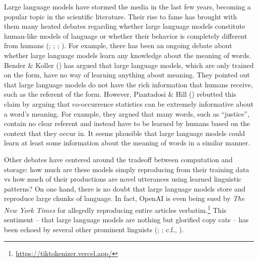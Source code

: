 \documentclass[
  12pt,
  letterpaper,
]{scrreprt}
\begin{document}
Large language models have stormed the media in the last few years,
becoming a popular topic in the scientific literature. Their rise to
fame has brought with them many heated debates regarding whether large
language models constitute human-like models of language or whether
their behavior is completely different from humans
(;
;
;
). For example, there has been an ongoing debate about whether
large language models learn any knowledge about the meaning of words.
Bender \& Koller () has
argued that large language models, which are only trained on the form,
have no way of learning anything about meaning. They pointed out that
large language models do not have the rich information that humans
receive, such as the referent of the form. However, Piantadosi \& Hill
() rebutted this
claim by arguing that co-occurrence statistics can be extremely
informative about a word's meaning. For example, they argued that many
words, such as ``justice'', contain no clear referent and instead have
to be learned by humans based on the context that they occur in. It
seems plausible that large language models could learn at least some
information about the meaning of words in a similar manner.

Other debates have centered around the tradeoff between computation and
storage: how much are these models simply reproducing from their
training data vs how much of their productions are novel utterances
using learned linguistic patterns? On one hand, there is no doubt that
large language models store and reproduce large chunks of language. In
fact, OpenAI is even being sued by \emph{The New York Times} for
allegedly reproducing entire articles verbatim.\footnote{\url{https://tiktokenizer.vercel.app/}}
This sentiment -- that large language models are nothing but glorified
copy cats -- has been echoed by several other prominent linguists
(;
;
c.f., ).
\end{document}
